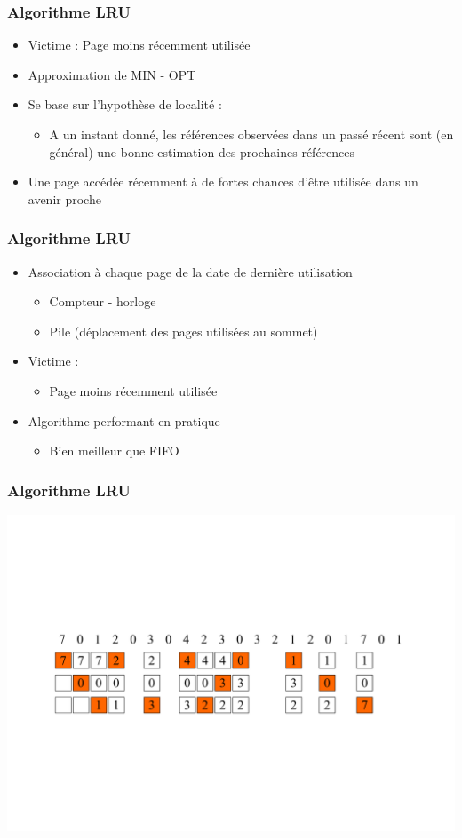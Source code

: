 \begin{frame}
\frametitle{Algorithme LRU}
\begin{itemize}
\item Victime : Page moins récemment utilisée
\item Approximation de MIN - OPT
\item Se base sur l'hypothèse de localité :
\begin{itemize}
\item A un instant donné, les références observées dans un passé récent sont (en général) une bonne estimation des prochaines références
\end{itemize}
\item Une page accédée récemment à de fortes chances d'être utilisée dans un avenir proche
\end{itemize}
\end{frame}


\begin{frame}
\frametitle{Algorithme LRU}
\begin{itemize}
\item Association à chaque page de la date de dernière utilisation
\begin{itemize}
\item Compteur - horloge
\item Pile (déplacement des pages utilisées au sommet)
\end{itemize}
\item Victime :
\begin{itemize}
\item Page moins récemment utilisée
\end{itemize}
\item Algorithme performant en pratique
\begin{itemize}
\item Bien meilleur que FIFO
\end{itemize}
\end{itemize}
\end{frame}


\begin{frame}
\frametitle{Algorithme LRU}
\includegraphics[width=\textwidth]{../illustration/remplacement_lru.pdf}
\end{frame}


